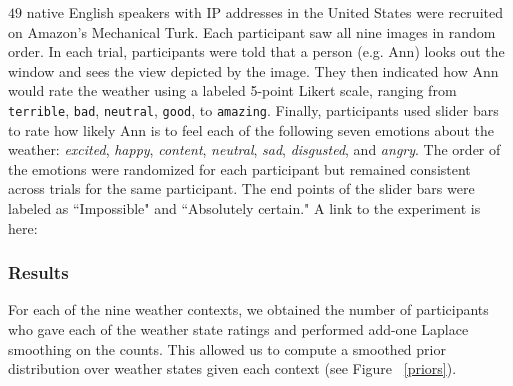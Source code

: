 \documentclass[10pt,letterpaper]{article}
\begin{document}
$49$ native English speakers with IP addresses in the United States were recruited on Amazon's Mechanical Turk. Each participant saw all nine images in random order. In each trial, participants were told that a person (e.g. Ann) looks out the window and sees the view depicted by the image. They then indicated how Ann would rate the weather using a labeled 5-point Likert scale, ranging from \texttt{terrible}, \texttt{bad}, \texttt{neutral}, \texttt{good}, to \texttt{amazing}. Finally, participants used slider bars to rate how likely Ann is to feel each of the following seven emotions about the weather: \emph{excited}, \emph{happy}, \emph{content}, \emph{neutral}, \emph{sad}, \emph{disgusted}, and \emph{angry}.  The order of the emotions were randomized for each participant but remained consistent across trials for the same participant. The end points of the slider bars were labeled as ``Impossible" and ``Absolutely certain." A link to the experiment is here:
  
 
\subsubsection{Results}


For each of the nine weather contexts, we obtained the number of participants who gave each of the weather state ratings and performed add-one Laplace smoothing on the counts. This allowed us to compute a smoothed prior distribution over weather states given each context (see Figure ~\ref{priors}). %
\end{document}
